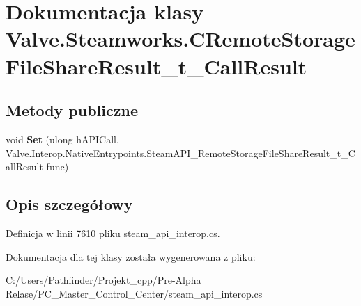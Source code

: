 \hypertarget{class_valve_1_1_steamworks_1_1_c_remote_storage_file_share_result__t___call_result}{}\section{Dokumentacja klasy Valve.\+Steamworks.\+C\+Remote\+Storage\+File\+Share\+Result\+\_\+t\+\_\+\+Call\+Result}
\label{class_valve_1_1_steamworks_1_1_c_remote_storage_file_share_result__t___call_result}
\subsection*{Metody publiczne}
\begin{DoxyCompactItemize}
\item 
\mbox{\label{class_valve_1_1_steamworks_1_1_c_remote_storage_file_share_result__t___call_result_ae5b4c8b8f28a7ca96fd903b664e8d358}} 
void {\bfseries Set} (ulong h\+A\+P\+I\+Call, Valve.\+Interop.\+Native\+Entrypoints.\+Steam\+A\+P\+I\+\_\+\+Remote\+Storage\+File\+Share\+Result\+\_\+t\+\_\+\+Call\+Result func)
\end{DoxyCompactItemize}


\subsection{Opis szczegółowy}


Definicja w linii 7610 pliku steam\+\_\+api\+\_\+interop.\+cs.



Dokumentacja dla tej klasy została wygenerowana z pliku\+:\begin{DoxyCompactItemize}
\item 
C\+:/\+Users/\+Pathfinder/\+Projekt\+\_\+cpp/\+Pre-\/\+Alpha Relase/\+P\+C\+\_\+\+Master\+\_\+\+Control\+\_\+\+Center/steam\+\_\+api\+\_\+interop.\+cs\end{DoxyCompactItemize}
